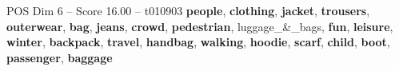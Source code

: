 \begin{textsample}{POS Dim 6 – Score 16.00 – t010903}  \label{ex:f6_pos_021}
\textbf{people}, \textbf{clothing}, \textbf{jacket}, \textbf{trousers}, \textbf{outerwear}, \textbf{bag}, \textbf{jeans}, \textbf{crowd}, \textbf{pedestrian}, luggage\_\&\_bags, \textbf{fun}, \textbf{leisure}, \textbf{winter}, \textbf{backpack}, \textbf{travel}, \textbf{handbag}, \textbf{walking}, \textbf{hoodie}, \textbf{scarf}, \textbf{child}, \textbf{boot}, \textbf{passenger}, \textbf{baggage}

\end{textsample}
